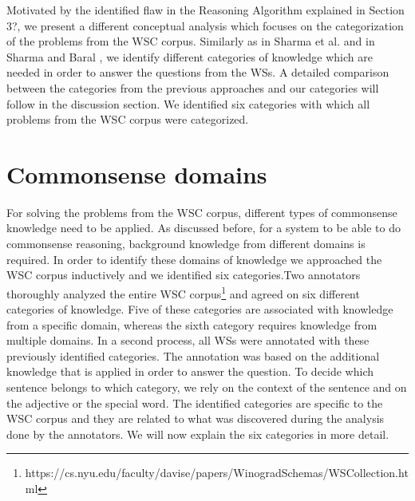 

Motivated by the identified flaw in the Reasoning Algorithm explained in Section 3?, we present a different conceptual analysis which focuses on the categorization of the problems from the WSC corpus. Similarly as in Sharma et al. \cite{DBLP:conf/ijcai/SharmaVAB15} and in Sharma and Baral \cite{2018CommonsenseKT}, we identify different categories of knowledge which are needed in order to answer the questions from the WSs. A detailed comparison between the categories from the previous approaches and our categories will follow in the discussion section. 
We identified six categories with which all problems from the WSC corpus were categorized. 
\begin{comment}
	In Sharma et al. \cite{DBLP:conf/ijcai/SharmaVAB15}, 71 WSs were categorized into two categories, whereas in \cite{2018CommonsenseKT} all problems from the WSC corpus were categorized into twelve different categories. 
We use the KParser for extracting the graph representation of the input sentence and question. Furthermore, we use the Reasoning Algorithm given in \cite{2018CommonsenseKT} for finding the correct answer with some small modification which will be explained later.
\end{comment}


\section{Commonsense domains}
For solving the problems from the WSC corpus, different types of commonsense knowledge need to be applied. As discussed before, for a system to be able to do commonsense reasoning, background knowledge from different domains is required. In order to identify these domains of knowledge we approached the WSC corpus inductively and we identified six categories.Two annotators thoroughly analyzed the entire WSC corpus\footnote{https://cs.nyu.edu/faculty/davise/papers/WinogradSchemas/WSCollection.html} and agreed on six different categories of knowledge. Five of these categories are associated with knowledge from a specific domain, whereas the sixth category requires knowledge from multiple domains.
In a second process, all WSs were annotated with these previously identified categories. The annotation was based on the additional knowledge that is applied in order to answer the question. To decide which sentence belongs to which category, we rely on the context of the sentence and on the adjective or the special word. The identified categories are specific to the WSC corpus and they are related to what was discovered during the analysis done by the annotators. We will now explain the six categories in more detail. 


